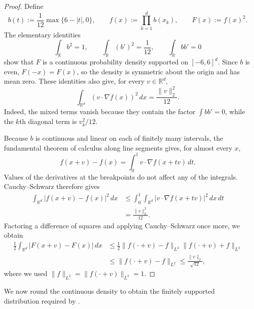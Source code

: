 \documentclass{article}
\newcommand{\R}{\mathbb{R}}
\begin{document}
\begin{proof}
Define
\[
b(t):=\frac1{12}\max\{6-|t|,0\},
\qquad
f(x):=\prod_{k=1}^d b(x_k),
\qquad
F(x):=f(x)^2.
\]
The elementary identities
\[
\int_{\R}b^2=1,
\qquad
\int_{\R}(b')^2=\frac1{12},
\qquad
\int_{\R}bb'=0
\]
show that $F$ is a continuous probability density supported on
$[-6,6]^d$. Since $b$ is even, $F(-x)=F(x)$, so the density is
symmetric about the origin and has mean zero.
These identities also give, for every $v\in\R^d$,
\begin{equation}
\label{eq:directional-energy}
\int_{\R^d}(v\cdot\nabla f(x))^2\,dx
=\frac{\|v\|_2^2}{12}.
\end{equation}
Indeed, the mixed terms vanish because they contain the factor
$\int bb'=0$, while the $k$th diagonal term is $v_k^2/12$.

Because $b$ is continuous and linear on each of finitely many
intervals, the fundamental theorem of calculus along line segments
gives, for almost every $x$,
\[
f(x+v)-f(x)=\int_0^1 v\cdot\nabla f(x+tv)\,dt.
\]
Values of the derivatives at the breakpoints do not affect any
of the integrals. Cauchy--Schwarz therefore gives
\[
\begin{aligned}
\int_{\R^d}|f(x+v)-f(x)|^2\,dx
&\le\int_0^1\int_{\R^d}
   |v\cdot\nabla f(x+tv)|^2\,dx\,dt\\
&=\frac{\|v\|_2^2}{12}.
\end{aligned}
\]
Factoring a difference of squares and applying Cauchy--Schwarz
once more, we obtain
\begin{equation}
\label{eq:continuous-shift}
\begin{aligned}
\frac12\int_{\R^d}|F(x+v)-F(x)|\,dx
&\le\frac12\|f(\cdot+v)-f\|_{L^2}
                  \|f(\cdot+v)+f\|_{L^2}\\
&\le\|f(\cdot+v)-f\|_{L^2}
\le\frac{\|v\|_2}{\sqrt{12}},
\end{aligned}
\end{equation}
where we used $\|f\|_{L^2}=\|f(\cdot+v)\|_{L^2}=1$.
\end{proof}

We now round the continuous density to obtain the finitely
supported distribution required by .
\end{document}
